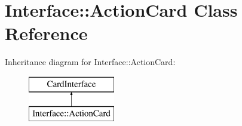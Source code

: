 \hypertarget{class_interface_1_1_action_card}{\section{Interface\-:\-:Action\-Card Class Reference}
\label{class_interface_1_1_action_card}
}
Inheritance diagram for Interface\-:\-:Action\-Card\-:\begin{figure}[H]
\begin{center}
\leavevmode
\includegraphics[height=2.000000cm]{class_interface_1_1_action_card}
\end{center}
\end{figure}
